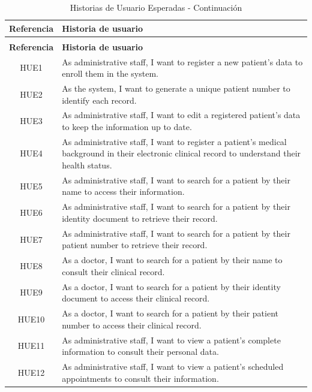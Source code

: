 \documentclass{prgrado}
\begin{document}
\begin{longtable}{|c|p{12cm}|}
\caption{Historias de Usuario Esperadas} \label{tab:historias_esperadas} \\
\hline
\textbf{Referencia} & \textbf{Historia de usuario} \\
\hline
\endfirsthead

\caption{Historias de Usuario Esperadas - Continuación} \\
\hline
\textbf{Referencia} & \textbf{Historia de usuario} \\
\hline
\endhead

\hline
\endfoot

\hline
\endlastfoot

HUE1 & As administrative staff, I want to register a new patient's data to enroll them in the system. \\ \hline
HUE2 & As the system, I want to generate a unique patient number to identify each record. \\ \hline
HUE3 & As administrative staff, I want to edit a registered patient's data to keep the information up to date. \\ \hline
HUE4 & As administrative staff, I want to register a patient's medical background in their electronic clinical record to understand their health status. \\ \hline
HUE5 & As administrative staff, I want to search for a patient by their name to access their information. \\ \hline
HUE6 & As administrative staff, I want to search for a patient by their identity document to retrieve their record. \\ \hline
HUE7 & As administrative staff, I want to search for a patient by their patient number to retrieve their record. \\ \hline
HUE8 & As a doctor, I want to search for a patient by their name to consult their clinical record. \\ \hline
HUE9 & As a doctor, I want to search for a patient by their identity document to access their clinical record. \\ \hline
HUE10 & As a doctor, I want to search for a patient by their patient number to access their clinical record. \\ \hline
HUE11 & As administrative staff, I want to view a patient's complete information to consult their personal data. \\ \hline
HUE12 & As administrative staff, I want to view a patient's scheduled appointments to consult their information. \\ \hline

\end{longtable}
\end{document}
